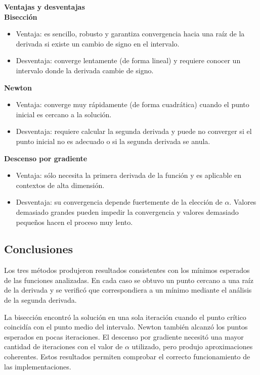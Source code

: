 \documentclass[12pt]{article}
\begin{document}
\textbf{Ventajas y desventajas}\\

\textbf{Bisección}

\begin{itemize}
\item Ventaja: es sencillo, robusto y garantiza convergencia hacia una raíz de la derivada si existe un cambio de signo en el intervalo.
\item Desventaja: converge lentamente (de forma lineal) y requiere conocer un intervalo donde la derivada cambie de signo.
\end{itemize}

\textbf{Newton}

\begin{itemize}
\item Ventaja: converge muy rápidamente (de forma cuadrática) cuando el punto inicial es cercano a la solución.
\item Desventaja: requiere calcular la segunda derivada y puede no converger si el punto inicial no es adecuado o si la segunda derivada se anula.
\end{itemize}

\textbf{Descenso por gradiente}

\begin{itemize}
\item Ventaja: sólo necesita la primera derivada de la función y es aplicable en contextos de alta dimensión.
\item Desventaja: su convergencia depende fuertemente de la elección de $\alpha$. Valores demasiado grandes pueden impedir la convergencia y valores demasiado pequeños hacen el proceso muy lento.
\end{itemize}

\subsection{Conclusiones}

Los tres métodos produjeron resultados consistentes con los mínimos esperados de las funciones analizadas. En cada caso se obtuvo un punto cercano a una raíz de la derivada y se verificó que correspondiera a un mínimo mediante el análisis de la segunda derivada.

La bisección encontró la solución en una sola iteración cuando el punto crítico coincidía con el punto medio del intervalo. Newton también alcanzó los puntos esperados en pocas iteraciones. El descenso por gradiente necesitó una mayor cantidad de iteraciones con el valor de $\alpha$ utilizado, pero produjo aproximaciones coherentes. Estos resultados permiten comprobar el correcto funcionamiento de las implementaciones.
\end{document}
